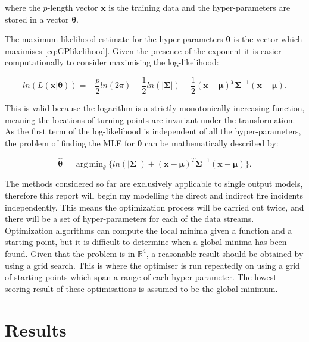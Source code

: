 \documentclass[a4paper,11pt]{report}
\DeclareMathOperator*{\argmin}{arg\,min}
\begin{document}
where the \(p\)-length vector \(\mathbf{x}\) is the training data and the hyper-parameters are stored in a vector \(\boldsymbol{\theta}\).

The maximum likelihood estimate for the hyper-parameters \(\boldsymbol{\theta}\) is the vector which maximises \ref{eq:GPlikelihood}. Given the presence of the exponent it is easier computationally to consider maximising the log-likelihood:

\begin{equation} \label{eq:GPloglikelihood}
ln(L(\mathbf{x} | \boldsymbol{\theta})) = - \frac{p}{2} ln(2\pi) - \frac{1}{2} ln(|\boldsymbol{\Sigma}|) - \frac{1}{2} (\mathbf{x}-\boldsymbol{\mu})^{T} \boldsymbol{\Sigma}^{-1}(\mathbf{x}-\boldsymbol{\mu}).
\end{equation}

This is valid because the logarithm is a strictly monotonically increasing function, meaning the locations of turning points are invariant under the transformation. As the first term of the log-likelihood is independent of all the hyper-parameters, the problem of finding the MLE for \(\boldsymbol{\theta}\) can be mathematically described by:

\begin{equation}
\hat{\boldsymbol{\theta}} = \argmin_\theta{\{ln(|\boldsymbol{\Sigma}|) +(\mathbf{x}-\boldsymbol{\mu})^{T}\boldsymbol{\Sigma}^{-1}(\mathbf{x}-\boldsymbol{\mu})}\}.
\end{equation}

The methods considered so far are exclusively applicable to single output models, therefore this report will begin my modelling the direct and indirect fire incidents independently. This means the optimization process will be carried out twice, and there will be a set of hyper-parameters for each of the data streams. \\

Optimization algorithms can compute the local minima given a function and a starting point, but it is difficult to determine when a global minima has been found. Given that the problem is in \(\mathds{R}^4\), a reasonable result should be obtained by using a grid search. This is where the optimiser is run repeatedly on using a grid of starting points which span a range of each hyper-parameter. The lowest scoring result of these optimisations is assumed to be the global minimum. \par

\section{Results}
\end{document}
